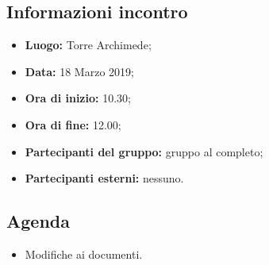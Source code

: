 \subsection{Informazioni incontro}
\begin{itemize}
	\item { \textbf{Luogo:} Torre Archimede};
	\item { \textbf{Data:} 18 Marzo 2019};
	\item { \textbf{Ora di inizio:} 10.30};
	\item { \textbf{Ora di fine:} 12.00};
	\item { \textbf{Partecipanti del gruppo:} gruppo al completo};
	\item { \textbf{Partecipanti esterni:} nessuno}.
\end{itemize}


\subsection{Agenda}
\begin{itemize}
	\item {Modifiche ai documenti.}
\end{itemize}

